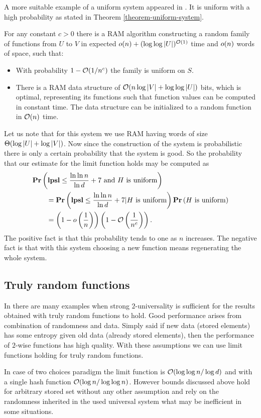 A more suitable example of a uniform system appeared in \cite{DBLP:journals/siamcomp/PaghP08}. It is uniform with a high probability as stated in Theorem \ref{theorem-uniform-system}.
\begin{theorem}
\label{theorem-uniform-system}
For any constant $c > 0$ there is a RAM algorithm constructing a random family of functions from $U$ to $V$ in expected $o(n) + (\log \log|U|)^{\mathcal{O}(1)}$ time and $o(n)$ words of space, such that:
\begin{itemize}
\item With probability $1 - \mathcal{O}(1 / n^c)$ the family is uniform on $S$.
\item There is a RAM data structure of $\mathcal{O}(n \log|V| + \log \log|U|)$ bits, which is optimal, representing its functions such that function values can be computed in constant time. The data structure can be initialized to a random function in $\mathcal{O}(n)$ time.
\end{itemize}
\end{theorem}

Let us note that for this system we use RAM having words of size $\mathrm{\Theta}(\log |U| + \log |V|)$. Now since the construction of the system is probabilistic there is only a certain probability that the system is good. So the probability that our estimate for the limit function holds may be computed as 
\[
\begin{split} 
& \mathbf{Pr}\left(\mathbf{lpsl} \leq \frac{\ln \ln n}{\ln d} + 7 \mbox{ and } H \mbox{ is uniform}\right) \\
	& \qquad = \mathbf{Pr}\left(\mathbf{lpsl} \leq \frac{\ln \ln n}{\ln d} + 7 | H \mbox{ is uniform}\right) \mathbf{Pr}\left(H \mbox{ is uniform}\right) \\ 
	& \qquad = \left(1 - o\left(\frac{1}{n}\right)\right)\left(1 - \mathcal{O}\left(\frac{1}{n^c}\right)\right). \\
\end{split}
\]
The positive fact is that this probability tends to one as $n$ increases. The negative fact is that with this system choosing a new function means regenerating the whole system.

\subsection{Truly random functions}
\label{subsection-truly-random-functions}
In \cite{DBLP:conf/soda/MitzenmacherV08} there are many examples when strong $2$-universality is sufficient for the results obtained with truly random functions to hold. Good performance arises from combination of randomness and data. Simply said if new data (stored elements) has some entropy given old data (already stored elements), then the performance of $2$-wise functions has high quality. With these assumptions we can use limit functions holding for truly random functions.

In case of two choices paradigm the limit function is $\mathcal{O}(\log \log n / \log d)$ and with a single hash function $\mathcal{O}(\log n / \log \log n)$. However bounds discussed above hold for arbitrary stored set without any other assumption and rely on the randomness inherited in the used universal system what may be inefficient in some situations.



